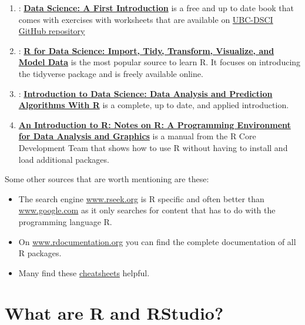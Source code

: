 \documentclass[
  12pt,
  oneside]{book}
\providecommand{\tightlist}{%
  \setlength{\itemsep}{0pt}\setlength{\parskip}{0pt}}
\theoremstyle{definition}
\theoremstyle{definition}
\theoremstyle{definition}
\theoremstyle{definition}
\theoremstyle{remark}
\begin{document}
\begin{enumerate}
\def\labelenumi{\arabic{enumi}.}
\tightlist
\item
  \citet{Timbers2022Data}: \href{https://datasciencebook.ca/}{\textbf{Data Science: A First Introduction}} is a free and up to date book that comes with exercises with worksheets that are available on \href{https://github.com/UBC-DSCI/data-science-a-first-intro-worksheets}{UBC-DSCI GitHub repository}
\item
  \citet{Wickham2023R}: \href{https://r4ds.hadley.nz/}{\textbf{R for Data Science: Import, Tidy, Transform, Visualize, and Model Data}} is the most popular source to learn R. It focuses on introducing the tidyverse package and is freely available online.
\item
  \citet{Irizarry2022Introduction}: \href{http://rafalab.dfci.harvard.edu/dsbook/}{\textbf{Introduction to Data Science: Data Analysis and Prediction Algorithms With R}} is a complete, up to date, and applied introduction.
\item
  \citet{Venables2022Introduction} \href{https://cran.r-project.org/doc/manuals/r-release/R-intro.pdf}{\textbf{An Introduction to R: Notes on R: A Programming Environment for Data Analysis and Graphics}} is a manual from the R Core Development Team that shows how to use R without having to install and load additional packages.
\end{enumerate}

Some other sources that are worth mentioning are these:

\begin{itemize}
\tightlist
\item
  The search engine \href{http://www.rseek.org}{www.rseek.org} is R specific and often better than \href{http://www.google.com}{www.google.com} as it only searches for content that has to do with the programming language R.
\item
  On \href{http://www.rdocumentation.org}{www.rdocumentation.org} you can find the complete documentation of all R packages.
\item
  Many find these \href{https://rstudio.com/resources/cheatsheets/}{cheatsheets} helpful.
\end{itemize}

\hypertarget{r-rstudio}{%
\section{What are R and RStudio?}\label{r-rstudio}}
\end{document}
